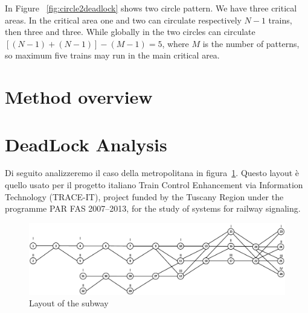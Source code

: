 \documentclass{ewic}
\begin{document}
			
			In Figure ~\ref{fig:circle2deadlock} shows two circle pattern. We have three critical areas. In the critical area one and two can circulate respectively $N-1$ trains, then three and three. While globally in the two circles can circulate $[(N-1) + (N-1)] - (M-1)=5$, where $M$ is the number of patterns, so maximum five trains may run in the main critical area.
			
			\section{Method overview}\label{sec:method}
			
			
			\section{DeadLock Analysis}
Di seguito analizzeremo il caso della metropolitana in figura~\ref{fig:example}. 
Questo layout è quello usato per il progetto italiano Train Control Enhancement via Information Technology (TRACE-IT), project funded by the Tuscany Region under the programme PAR FAS 2007–2013, for the study of systems for railway signaling.

			\begin{figure}[htp]
				\begin{centering}	
				\includegraphics[scale=0.5]{img/esempioG}
				\caption{Layout of the subway}
				\label{fig:example}
				\end{centering}
			\end{figure}
\end{document}
